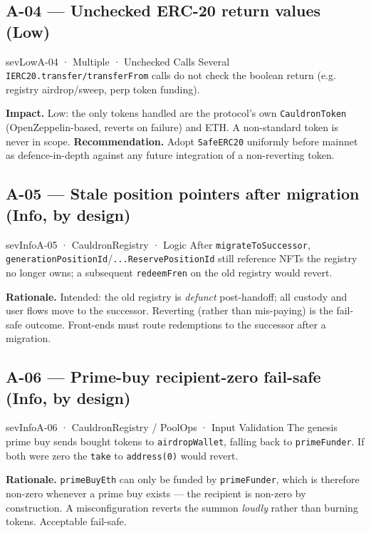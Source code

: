 \documentclass[11pt]{article}
\newcommand{\sev}[2]{\textcolor{#1}{\textbf{#2}}}
\begin{document}
\subsection{A-04 --- Unchecked ERC-20 return values \sev{sevLow}{(Low)}}
\begin{finding}{sevLow}{A-04 · Multiple · Unchecked Calls}
Several \texttt{IERC20.transfer/transferFrom} calls do not check the boolean return
(e.g. registry airdrop/sweep, perp token funding).
\end{finding}

\noindent\textbf{Impact.} Low: the only tokens handled are the protocol's own
\texttt{CauldronToken} (OpenZeppelin-based, reverts on failure) and ETH. A non-standard
token is never in scope. \textbf{Recommendation.} Adopt \texttt{SafeERC20} uniformly before
mainnet as defence-in-depth against any future integration of a non-reverting token.

\subsection{A-05 --- Stale position pointers after migration \sev{sevInfo}{(Info, by design)}}
\begin{finding}{sevInfo}{A-05 · CauldronRegistry · Logic}
After \texttt{migrateToSuccessor}, \texttt{generationPositionId}/\texttt{...ReservePositionId}
still reference NFTs the registry no longer owns; a subsequent \texttt{redeemFren} on the
old registry would revert.
\end{finding}

\noindent\textbf{Rationale.} Intended: the old registry is \emph{defunct} post-handoff;
all custody and user flows move to the successor. Reverting (rather than mis-paying) is the
fail-safe outcome. Front-ends must route redemptions to the successor after a migration.

\subsection{A-06 --- Prime-buy recipient-zero fail-safe \sev{sevInfo}{(Info, by design)}}
\begin{finding}{sevInfo}{A-06 · CauldronRegistry / PoolOps · Input Validation}
The genesis prime buy sends bought tokens to
\texttt{airdropWallet}, falling back to \texttt{primeFunder}. If both were zero the
\texttt{take} to \texttt{address(0)} would revert.
\end{finding}

\noindent\textbf{Rationale.} \texttt{primeBuyEth} can only be funded by
\texttt{primeFunder}, which is therefore non-zero whenever a prime buy exists — the
recipient is non-zero by construction. A misconfiguration reverts the summon
\emph{loudly} rather than burning tokens. Acceptable fail-safe.
\end{document}
